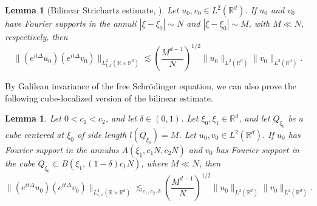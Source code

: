 \documentclass[reqno,11pt]{amsart}
\theoremstyle{plain}
\newtheorem{lemma}[theorem]{Lemma}
\theoremstyle{definition}
\numberwithin{equation}{section}
\numberwithin{theorem}{section}
\def\R{\mathbb{R}}
\begin{document}
\begin{lemma}[Bilinear Strichartz estimate, \cite{KV}]\label{prop:bs_B} %
Let $u_{0},v_{0}\in L^{2}(\R^{d})$. If $u_{0}$ and $v_{0}$ have Fourier supports in the annuli $|\xi-\xi_0|\sim N$ and $|\xi-\xi_0|\sim M$, with $M\ll N$, respectively, then 
\begin{equation}
\|(e^{it\Delta}u_{0})(e^{it\Delta}v_{0})\|_{L_{t,x}^2(\R\times\R^{d})} \lesssim \left(\frac{M^{d-1}}{N}\right)^{1/2}\|u_{0}\|_{L^{2}(\R^{d})}\|v_{0}\|_{L^{2}(\R^{d})}.
\end{equation}
\end{lemma}

By Galilean invariance of the free Schr\"{o}dinger equation, we can also prove the following cube-localized version of the bilinear estimate.
\begin{lemma}\label{prop:cube_BS} %
Let $0<c_{1}<c_{2}$, and let $\delta \in (0,1)$. Let $\xi_{0}, \xi_1\in\R^{d}$, and let $Q_{\xi_{0}}$ be a cube centered at $\xi_{0}$ of side length $l(Q_{\xi_{0}})=M$. Let $u_{0},v_{0}\in L^{2}(\R^{d})$. 
If $u_{0}$ has Fourier support in the annulus $A(\xi_1,c_{1}N,c_{2}N)$ and $v_{0}$ has Fourier support in the cube $Q_{\xi_{0}} \subset B(\xi_1,(1-\delta)c_{1}N)$, where $M\ll N$, then 
\begin{equation}
\|(e^{it\Delta}u_{0})(e^{it\Delta}v_{0})\|_{L_{t,x}^{2}(\R\times\R^{d})}\lesssim_{c_{1},c_{2},\delta} \left(\frac{M^{d-1}}{N}\right)^{1/2}\|u_{0}\|_{L^{2}(\R^{d})}\|v_{0}\|_{L^{2}(\R^{d})}.
\end{equation}
\end{lemma}
\end{document}
